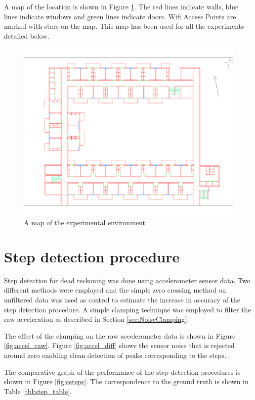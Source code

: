 A map of the location is shown in Figure \ref{fig:ravindra_map}. The red lines
indicate walls, blue lines indicate windows and green lines indicate doors.
Wifi Access Points are marked with stars on the map. This map has been used
for all the experiments detailed below.

\begin{figure}
    \centering
    \includegraphics[width=6in]{figures/ravindra_map.png}
    \caption{A map of the experimental environment\label{fig:ravindra_map}}
\end{figure}



\section{Step detection procedure}

Step detection for dead reckoning was done using accelerometer sensor data.
Two different methods were employed and the simple zero crossing method on 
unfiltered data was used as control to estimate the increase in accuracy of the
step detection procedure. A simple clamping technique was employed to filter the
raw acceleration as described in Section \ref{sec:NoiseClamping}.

The effect of the clamping on the raw accelerometer data is shown in 
Figure \ref{fig:accel_raw}. Figure \ref{fig:accel_diff} shows the sensor noise
that is rejected around zero enabling clean detection of peaks corresponding to
the steps.

The comparative graph of the performance of the step detection procedures 
is shown in Figure \ref{fig:csteps}. The correspondence to the ground truth
is shown in Table \ref{tbl:step_table}.

